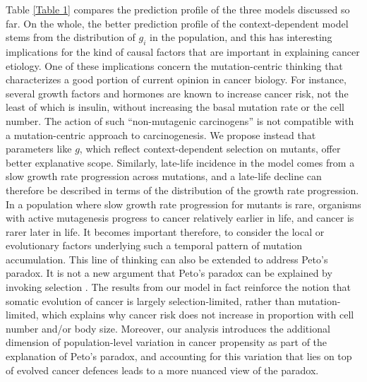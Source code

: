 \documentclass[9pt,onecolumn,twoside]{pnas-new}
\begin{document}
Table \ref{Table 1} compares the prediction profile of the three models discussed so far. On the whole, the better prediction profile of the context-dependent model stems from the distribution of $g_{i}$ in the population, and this has interesting implications for the kind of causal factors that are important in explaining cancer etiology. One of these implications concern the mutation-centric thinking that characterizes a good portion of current opinion in cancer biology. For instance, several growth factors and hormones are known to increase cancer risk, not the least of which is insulin, without increasing the basal mutation rate or the cell number. The action of such ``non-mutagenic carcinogens'' is not compatible with a mutation-centric approach to carcinogenesis. We propose instead that parameters like $g$, which reflect context-dependent selection on mutants, offer better explanative scope.
Similarly, late-life incidence in the model comes from a slow growth rate progression across mutations, and a late-life decline can therefore be described in terms of the distribution of the growth rate progression. In a population where slow growth rate progression for mutants is rare, organisms with active mutagenesis progress to cancer relatively earlier in life, and cancer is rarer later in life. It becomes important therefore, to consider the local or evolutionary factors underlying such a temporal pattern of mutation accumulation.
This line of thinking can also be extended to address Peto's paradox. It is not a new argument that Peto's paradox can be explained by invoking selection \cite{Caulin2011,Noble2015,Tollis2017b}. The results from our model in fact reinforce the notion that somatic evolution of cancer is largely selection-limited, rather than mutation-limited, which explains why cancer risk does not increase in proportion with cell number and/or body size. Moreover, our analysis introduces the additional dimension of population-level variation in cancer propensity as part of the explanation of Peto's paradox, and accounting for this variation that lies on top of evolved cancer defences leads to a more nuanced view of the paradox.
\end{document}
